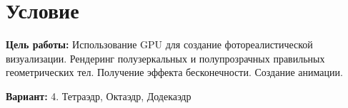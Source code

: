 \section{Условие}
\textbf{Цель работы:} Использование GPU для создание фотореалистической визуализации. Рендеринг полузеркальных и полупрозрачных правильных геометрических тел. Получение эффекта бесконечности. Создание анимации.

\textbf{Вариант:} 4. Тетраэдр, Октаэдр, Додекаэдр